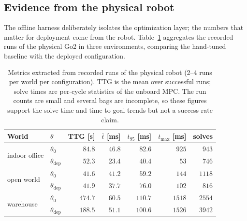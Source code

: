 \documentclass[11pt,a4paper]{article}
\newcommand{\thn}{\theta_0}
\newcommand{\thst}{\theta_{\mathrm{dep}}}
\begin{document}
\subsection{Evidence from the physical robot}
\label{sec:hardware}

The offline harness deliberately isolates the optimization layer; the numbers that matter for deployment come
from the robot. Table~\ref{tab:bags} aggregates the recorded runs of the physical Go2 in three environments,
comparing the hand-tuned baseline with the deployed configuration.

\begin{table}[htbp]
  \centering
  \small
  \caption{Metrics extracted from recorded runs of the physical robot (2--4 runs per world per
  configuration). TTG is the mean over successful runs; solve times are per-cycle statistics of the onboard
  MPC. The run counts are small and several bags are incomplete, so these figures support the solve-time and
  time-to-goal trends but not a success-rate claim.}
  \label{tab:bags}
  \begin{tabular}{llrrrrr}
    \toprule
    World & $\theta$ & TTG [s] & $\bar t$ [ms] & $t_{95}$ [ms] & $t_{\max}$ [ms] & solves \\
    \midrule
    \multirow{2}{*}{indoor office} & $\thn$  & $84.8$  & $46.8$ & $82.6$  & $925$  & $943$ \\
                                   & $\thst$ & $52.3$  & $23.4$ & $40.4$  & $53$   & $746$ \\
    \multirow{2}{*}{open world}    & $\thn$  & $41.6$  & $41.2$ & $59.2$  & $144$  & $1118$ \\
                                   & $\thst$ & $41.9$  & $37.7$ & $76.0$  & $102$  & $816$ \\
    \multirow{2}{*}{warehouse}     & $\thn$  & $474.7$ & $60.5$ & $110.7$ & $1518$ & $2554$ \\
                                   & $\thst$ & $188.5$ & $51.1$ & $100.6$ & $1526$ & $3942$ \\
    \bottomrule
  \end{tabular}
\end{table}
\end{document}
